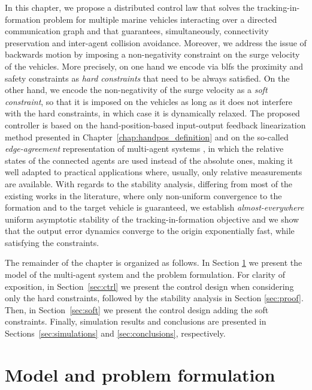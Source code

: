 In this chapter, we propose a distributed control law that solves the tracking-in-formation problem for multiple marine vehicles interacting over a directed communication graph and that guarantees, simultaneously, connectivity preservation and inter-agent collision avoidance.
Moreover, we address the issue of backwards motion by imposing a non-negativity constraint on the surge velocity of the vehicles.
More precisely, on one hand we encode via \glspl{blf} the proximity and safety constraints as \emph{hard constraints} that need to be always satisfied.
On the other hand, we encode the non-negativity of the surge velocity as a \emph{soft constraint}, so that it is imposed on the vehicles as long as it does not interfere with the hard constraints, in which case it is dynamically relaxed.
The proposed controller is based on the hand-position-based input-output feedback linearization method presented in Chapter~\ref{chap:handpos_definition} and on the so-called \emph{edge-agreement} representation of multi-agent systems \cite{mesbahi_graph_2010}, in which the relative states of the connected agents are used instead of the absolute ones, making it well adapted to practical applications where, usually, only relative measurements are available.
With regards to the stability analysis, differing from most of the existing works in the literature, where only non-uniform convergence to the formation and to the target vehicle is guaranteed, we establish \emph{almost-everywhere} uniform asymptotic stability of the tracking-in-formation objective and we show that the output error dynamics converge to the origin exponentially fast, while satisfying the constraints.

The remainder of the chapter is organized as follows.
In Section \ref{sec:preliminaries} we present the model of the multi-agent system and the problem formulation. For clarity of exposition, in Section~\ref{sec:ctrl} we present the control design when considering only the hard constraints, followed by the stability analysis in Section \ref{sec:proof}. Then, in Section~\ref{sec:soft} we present the control design adding the soft constraints. Finally, simulation results and conclusions are presented in Sections~\ref{sec:simulations} and \ref{sec:conclusions}, respectively.

\section{Model and problem formulation}\label{sec:preliminaries}

